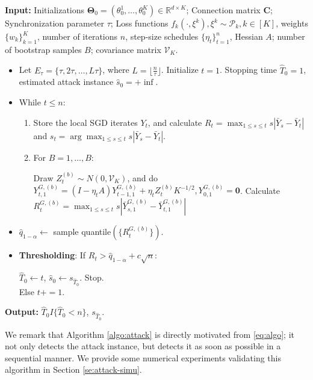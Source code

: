 \documentclass[a4paper,11pt]{article}
\numberwithin{equation}{section}
\theoremstyle{plain}
\theoremstyle{remark}
\begin{document}
 \begin{algorithm}[H]\caption{\texttt{Time-uniform Gaussian bootstrap}} \label{algo:attack}
    \textbf{Input: } Initializations $\mathbf{\Theta}_0=(\theta_0^1,\ldots, \theta_0^K)\in \mathbb{R}^{d \times K}$; Connection matrix $\mathbf{C}$; Synchronization parameter $\tau$; Loss functions $f_k(\cdot, \xi^k), \xi^k\sim \mathcal{P}_k, k \in [K]$, weights $\{w_k\}_{k=1}^K$, number of iterations $n$, step-size schedules $\{\eta_{t}\}_{t=1}^n$, Hessian $A$; number of bootstrap samples $B$; covariance matrix $\mathcal{V}_K$. 
\begin{itemize}[noitemsep,topsep=0pt]
  \item Let 
    \(E_{\tau}=\{\tau,2\tau,\dots,L\tau\}\), where 
    \(L=\big\lfloor\tfrac{n}{\tau}\big\rfloor\). Initialize $t=1$. Stopping time $\hat{T}_0 =1$, estimated attack instance $\hat{s}_0=+\inf$.
\item 
While $t\leq n$:
    \begin{enumerate}
   \item Store the local SGD iterates $Y_t$, and calculate $R_t = \max_{1\leq s \leq t}s|\bar{Y}_s -\bar{Y}_t|$ and $s_t = \arg\max_{1\leq s \leq t}s|\bar{Y}_s -\bar{Y}_t|$.
     \item For $B=1,\ldots, B$:
     
     Draw $Z_t^{(b)}\sim N(0, \mathcal{V}_K)$, and do $ Y_{t,1}^{G, (b)} = (I- \eta_t A)Y_{t-1, 1}^{G, (b)}+ \eta_t Z_t^{(b)}K^{-1/2},  Y_{0,1}^{G, (b)}= \mathbf{0}$. Calculate $R_t^{G, (b)}= \max_{1\leq s \leq t}s |\bar{Y}_{s,1}^{G, (b)} - \bar{Y}_{t,1}^{G, (b)}|$
     
    \end{enumerate}
    \item $\hat{q}_{1-\alpha} \leftarrow $ sample quantile$(\{R_t^{G,(b)}\})$.  
    \item \textbf{Thresholding}: If $R_t > \hat{q}_{1-\alpha} + c \sqrt{n}$: 
     
     \hspace{1cm} $\hat{T}_0 \leftarrow t$, $\hat{s}_0 \leftarrow s_{\hat{T}_0} $. Stop.\\
     Else $t+=1$.
  \end{itemize}
   \textbf{Output:} $\hat{T}_0I\{\hat{T}_0 < n\}$, $s_{\hat{T}_0}$.
\end{algorithm}
We remark that Algorithm \ref{algo:attack} is directly motivated from \eqref{eq:algo}; it not only detects the attack instance, but detects it as soon as possible in a sequential manner. We provide some numerical experiments validating this algorithm in Section \ref{se:attack-simu}.
\end{document}
